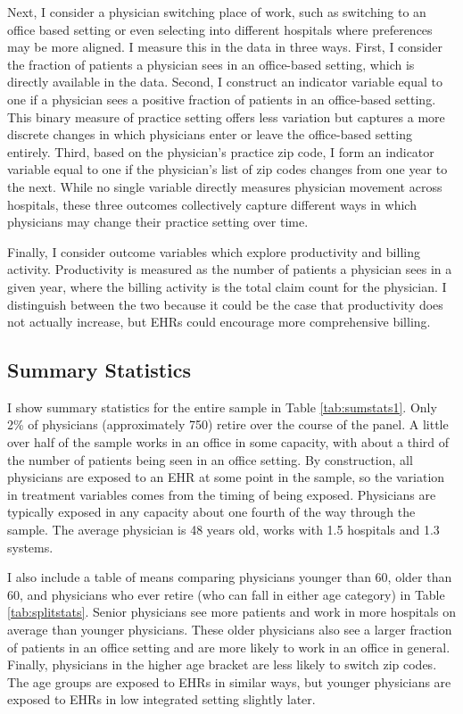 \documentclass[11pt]{article}
\begin{document}
Next, I consider a physician switching place of work, such as switching to an office based setting or even selecting into different hospitals where preferences may be more aligned. I measure this in the data in three ways. First, I consider the fraction of patients a physician sees in an office-based setting, which is directly available in the data. Second, I construct an indicator variable equal to one if a physician sees a positive fraction of patients in an office-based setting. This binary measure of practice setting offers less variation but captures a more discrete changes in which physicians enter or leave the office-based setting entirely. Third, based on the physician's practice zip code, I form an indicator variable equal to one if the physician's list of zip codes changes from one year to the next. While no single variable directly measures physician movement across hospitals, these three outcomes collectively capture different ways in which physicians may change their practice setting over time.

Finally, I consider outcome variables which explore productivity and billing activity. Productivity is measured as the number of patients a physician sees in a given year, where the billing activity is the total claim count for the physician. I distinguish between the two because it could be the case that productivity does not actually increase, but EHRs could encourage more comprehensive billing. 

\subsection{Summary Statistics}

I show summary statistics for the entire sample in Table \ref{tab:sumstats1}. Only 2\% of physicians (approximately 750) retire over the course of the panel. A little over half of the sample works in an office in some capacity, with about a third of the number of patients being seen in an office setting. By construction, all physicians are exposed to an EHR at some point in the sample, so the variation in treatment variables comes from the timing of being exposed. Physicians are typically exposed in any capacity about one fourth of the way through the sample. The average physician is 48 years old, works with 1.5 hospitals and 1.3 systems. 


I also include a table of means comparing physicians younger than 60, older than 60, and physicians who ever retire (who can fall in either age category) in Table \ref{tab:splitstats}. Senior physicians see more patients and work in more hospitals on average than younger physicians. These older physicians also see a larger fraction of patients in an office setting and are more likely to work in an office in general. Finally, physicians in the higher age bracket are less likely to switch zip codes. The age groups are exposed to EHRs in similar ways, but younger physicians are exposed to EHRs in low integrated setting slightly later. 
\end{document}
